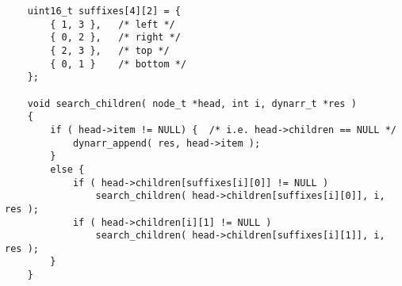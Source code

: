 \documentclass{article}
\begin{document}
\begin{verbatim}
    uint16_t suffixes[4][2] = {
        { 1, 3 },   /* left */
        { 0, 2 },   /* right */
        { 2, 3 },   /* top */
        { 0, 1 }    /* bottom */
    };

    void search_children( node_t *head, int i, dynarr_t *res )
    {
        if ( head->item != NULL) {  /* i.e. head->children == NULL */
            dynarr_append( res, head->item );
        }
        else {
            if ( head->children[suffixes[i][0]] != NULL )
                search_children( head->children[suffixes[i][0]], i, res );
            if ( head->children[i][1] != NULL )
                search_children( head->children[suffixes[i][1]], i, res );
        }
    }
\end{verbatim}
\end{document}
